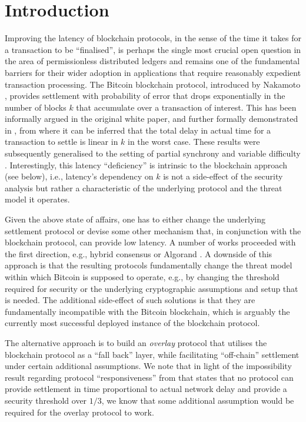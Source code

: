 
\section{Introduction}
\label{sec:intro}

Improving the latency of blockchain protocols, 
in the sense of the time it takes for a transaction to be ``finalised'',  
is perhaps the single most crucial 
open question in the area of permissionless distributed ledgers
and remains one of the  fundamental barriers for their wider adoption in applications that  require reasonably expedient transaction processing.
The Bitcoin blockchain protocol, introduced by Nakamoto \cite{bitcoin}, 
provides settlement with probability of error that drops exponentially
in the number of blocks $k$ that accumulate over a transaction of interest. 
This has been informally argued in the original white paper, 
and further formally demonstrated in \cite{gkl}, 
from where it can be inferred that the total delay in actual time 
for a transaction to settle
is linear in $k$ in the worst case. These results were subsequently
generalised to the setting of partial synchrony \cite{PSS16} and 
variable difficulty \cite{DBLP:conf/crypto/GarayKL17}. 
Interestingly, this latency ``deficiency'' is 
intrinsic to the blockchain approach (see below), i.e., 
latency's  dependency on $k$ is not a side-effect of the security analysis
but rather a characteristic of the underlying protocol and the threat model it operates. 

Given the above state of affairs, one has to either
change the underlying settlement protocol or devise some other mechanism that, 
in conjunction with the blockchain protocol, can provide low latency. 
A number of works proceeded with the first direction, e.g., hybrid consensus
\cite{DBLP:conf/wdag/PassS17} or Algorand \cite{DBLP:journals/corr/Micali16}. A downside of this approach is that the resulting protocols fundamentally change the threat model within which Bitcoin is supposed to operate, e.g., 
by changing the threshold required for security or the underlying cryptographic assumptions and setup that is needed. 
The additional side-effect of such solutions is that they are fundamentally incompatible with the Bitcoin blockchain, which is arguably  the currently most successful deployed instance  of the  blockchain protocol. 

The alternative approach is to build an {\em overlay} protocol that utilises the blockchain protocol as a ``fall back'' layer, while facilitating ``off-chain'' settlement under certain additional assumptions. We note that in light of the impossibility result regarding protocol ``responsiveness''  from \cite{DBLP:conf/wdag/PassS17} that states that no protocol can provide settlement in time proportional to actual network delay and provide a security threshold over $1/3$, we know that some additional assumption would be required for the overlay protocol to work.  

